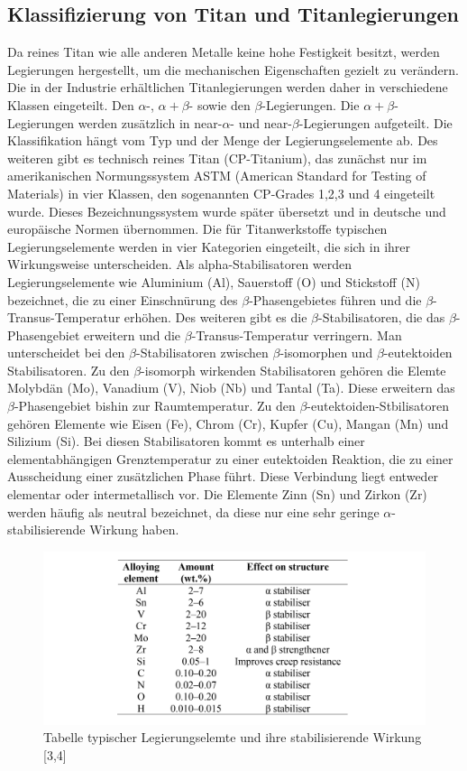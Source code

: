 \subsection{Klassifizierung von Titan und Titanlegierungen}

Da reines Titan wie alle anderen Metalle keine hohe Festigkeit besitzt, werden Legierungen hergestellt, um die mechanischen Eigenschaften gezielt zu verändern. Die in der Industrie erhältlichen Titanlegierungen werden daher in verschiedene Klassen eingeteilt. Den $\alpha$-, $\alpha+\beta$- sowie den $\beta$-Legierungen. Die $\alpha+\beta$-Legierungen werden zusätzlich in near-$\alpha$- und near-$\beta$-Legierungen aufgeteilt. Die Klassifikation hängt vom Typ und der Menge der Legierungselemente ab. Des weiteren gibt es technisch reines Titan (CP-Titanium), das zunächst nur im amerikanischen Normungssystem ASTM (American Standard for Testing of Materials) in vier Klassen, den sogenannten CP-Grades 1,2,3 und 4 eingeteilt wurde. Dieses Bezeichnungssystem wurde später übersetzt und in deutsche und europäische Normen übernommen.
Die für Titanwerkstoffe typischen Legierungselemente werden in vier Kategorien eingeteilt, die sich in ihrer Wirkungsweise unterscheiden. 
Als alpha-Stabilisatoren werden Legierungselemente wie Aluminium (Al), Sauerstoff (O) und Stickstoff (N) bezeichnet, die zu einer Einschnürung des $\beta$-Phasengebietes führen und die $\beta$-Transus-Temperatur erhöhen.
Des weiteren gibt es die $\beta$-Stabilisatoren, die das $\beta$-Phasengebiet erweitern und die $\beta$-Transus-Temperatur verringern. Man unterscheidet bei den $\beta$-Stabilisatoren zwischen $\beta$-isomorphen und $\beta$-eutektoiden Stabilisatoren. Zu den $\beta$-isomorph wirkenden Stabilisatoren gehören die Elemte Molybdän (Mo), Vanadium (V), Niob (Nb) und Tantal (Ta). Diese erweitern das $\beta$-Phasengebiet bishin zur Raumtemperatur. 
Zu den $\beta$-eutektoiden-Stbilisatoren gehören Elemente wie Eisen (Fe), Chrom (Cr), Kupfer (Cu), Mangan (Mn) und Silizium (Si). Bei diesen Stabilisatoren kommt es unterhalb einer elementabhängigen Grenztemperatur zu einer eutektoiden Reaktion, die zu einer Ausscheidung einer zusätzlichen Phase führt. Diese Verbindung liegt entweder elementar oder intermetallisch vor.
Die Elemente  Zinn (Sn) und Zirkon (Zr) werden häufig als neutral bezeichnet, da diese nur eine sehr geringe $\alpha$-stabilisierende Wirkung haben.

\begin{figure}[h]
	\centering
	\includegraphics[width=1.0\linewidth]{"Bilder/Tabelle 1"}
	\caption[Tabelle 1]{Tabelle typischer Legierungselemte und ihre stabilisierende Wirkung [3,4]}
	\label{fig:tabelle-1}
\end{figure}


